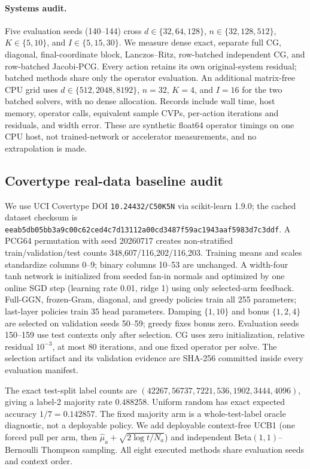 \documentclass[twoside]{article}
\begin{document}
\paragraph{Systems audit.}
Five evaluation seeds (140--144) cross
$d\in\{32,64,128\}$, $n\in\{32,128,512\}$, $K\in\{5,10\}$, and
$I\in\{5,15,30\}$.  We measure dense exact, separate full CG, diagonal,
final-coordinate block, Lanczos--Ritz, row-batched independent CG, and
row-batched Jacobi-PCG.  Every action retains its own original-system residual;
batched methods share only the operator evaluation.  An additional matrix-free
CPU grid uses $d\in\{512,2048,8192\}$, $n=32$, $K=4$, and $I=16$ for the
two batched solvers, with no dense allocation.  Records include wall time, host
memory, operator calls, equivalent sample CVPs, per-action iterations and
residuals, and width error.  These are synthetic float64 operator timings on one
CPU host, not trained-network or accelerator measurements, and no extrapolation
is made.

\subsection{Covertype real-data baseline audit}\label{sec:covertype-rerun}
We use UCI Covertype DOI \texttt{10.24432/C50K5N} via scikit-learn 1.9.0; the
cached dataset checksum is
\nolinkurl{eeab5db05bb3a9c00c62ced4c7d13112a00cd3487f59ac1943aaf5983d7c3ddf}.
A PCG64 permutation with seed 20260717 creates non-stratified train/validation/test
counts 348,607/116,202/116,203.  Training means and scales standardize columns
0--9; binary columns 10--53 are unchanged.  A width-four tanh network is initialized
from seeded fan-in normals and optimized by one online SGD step (learning rate 0.01,
ridge 1) using only selected-arm feedback.  Full-GGN, frozen-Gram, diagonal, and
greedy policies train all 255 parameters; last-layer policies train 35 head
parameters.  Damping $\{1,10\}$ and bonus $\{1,2,4\}$ are selected on validation
seeds 50--59; greedy fixes bonus zero.  Evaluation seeds 150--159 use test contexts
only after selection.  CG uses zero initialization, relative residual $10^{-3}$,
at most 80 iterations, and one fixed operator per solve.  The selection artifact and
its validation evidence are SHA-256 committed inside every evaluation manifest.

The exact test-split label counts are
$(42267,56737,7221,536,1902,3444,4096)$, giving a label-2 majority rate
$0.488258$.  Uniform random has exact expected accuracy $1/7=0.142857$.
The fixed majority arm is a whole-test-label oracle diagnostic, not a deployable
policy.  We add deployable context-free UCB1 (one forced pull per arm, then
$\hat\mu_a+\sqrt{2\log t/N_a}$) and independent Beta$(1,1)$--Bernoulli Thompson
sampling.  All eight executed methods share evaluation seeds and context order.
\end{document}
